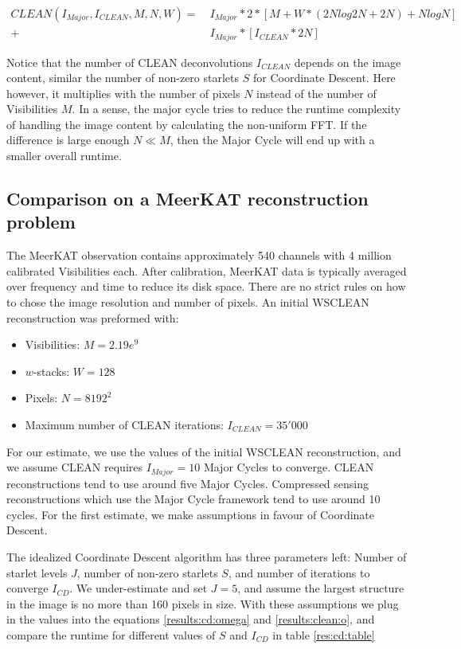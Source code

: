 \begin{equation}\label{results:clean:o}
\begin{aligned}
 CLEAN(I_{Major}, I_{CLEAN}, M, N,  W) =\: &I_{Major} * 2 * [M + W*(2N log 2N + 2N) + N log N]\\
+ &I_{Major} * [I_{CLEAN}*2N]
\end{aligned}
\end{equation}

Notice that the number of CLEAN deconvolutions $I_{CLEAN}$ depends on the image content, similar the number of non-zero starlets $S$ for Coordinate Descent. Here however, it multiplies with the number of pixels $N$ instead of the number of Visibilities $M$. In a sense, the major cycle tries to reduce the runtime complexity of handling the image content by calculating the non-uniform FFT. If the difference is large enough $N \ll M$, then the Major Cycle will end up with a smaller overall runtime.


\subsection{Comparison on a MeerKAT reconstruction problem}
The MeerKAT observation contains approximately 540 channels with 4 million calibrated Visibilities each. After calibration, MeerKAT data is typically averaged over frequency and time to reduce its disk space. There are no strict rules on how to chose the image resolution and number of pixels. An initial WSCLEAN reconstruction was preformed with:
\begin{itemize}
	\item Visibilities: $M=2.19e^9$
	\item $w$-stacks: $W = 128$
	\item Pixels: $N = 8192^2$
	\item Maximum number of CLEAN iterations: $I_{CLEAN} = 35'000$
\end{itemize}

For our estimate, we use the values of the initial WSCLEAN reconstruction, and we assume CLEAN requires $I_{Major}=10$ Major Cycles to converge. CLEAN reconstructions tend to use around five Major Cycles. Compressed sensing reconstructions which use the Major Cycle framework tend to use around 10 cycles. For the first estimate, we make assumptions in favour of Coordinate Descent.

The idealized Coordinate Descent algorithm has three parameters left: Number of starlet levels $J$, number of non-zero starlets $S$, and number of iterations to converge $I_{CD}$. We under-estimate and set $J=5$, and assume the largest structure in the image is no more than 160 pixels in size. With these assumptions we plug in the values into the equations \eqref{results:cd:omega} and \eqref{results:clean:o}, and compare the runtime for different values of $S$ and $I_{CD}$ in table \ref{res:cd:table}

